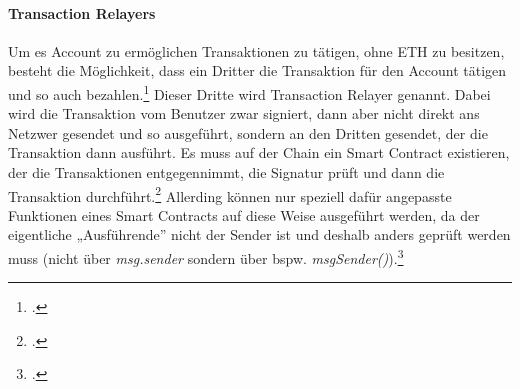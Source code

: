 \paragraph{Transaction Relayers}
\label{sec:definition-transaction-relayers}
Um es Account zu ermöglichen Transaktionen zu tätigen, ohne ETH zu besitzen, besteht die Möglichkeit, dass ein Dritter die Transaktion für den Account tätigen und so auch bezahlen.\footcites[Vgl. hierzu und zum Folgenden sowie weiterführend][]{w24}[]{w26}
Dieser Dritte wird Transaction Relayer genannt.
Dabei wird die Transaktion vom Benutzer zwar signiert, dann aber nicht direkt ans Netzwer gesendet und so ausgeführt, sondern an den Dritten gesendet, der die Transaktion dann ausführt.
Es muss auf der Chain ein Smart Contract existieren, der die Transaktionen entgegennimmt, die Signatur prüft und dann die Transaktion durchführt.\footcite[Vgl.][]{w25}
Allerding können nur speziell dafür angepasste Funktionen eines Smart Contracts auf diese Weise ausgeführt werden, da der eigentliche „Ausführende” nicht der Sender ist und deshalb anders geprüft werden muss (nicht über \textit{msg.sender} sondern über bspw. \textit{msgSender()}).\footcites[Vgl.][]{w27}[]{w24}